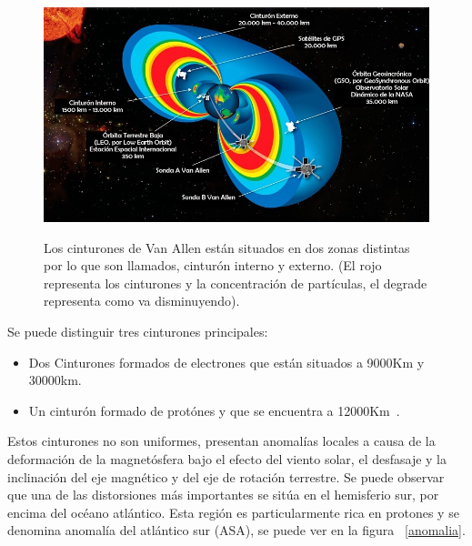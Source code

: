 \documentclass[a4paper,openright,12pt]{report}
\begin{document}
\begin{figure}[H]
	\centering
	\includegraphics[width=1 \textwidth]{img/Cinturones.jpg}
	\caption{Los cinturones de Van Allen están situados en dos zonas distintas por lo que son llamados, cinturón interno y externo. (El rojo representa los cinturones y la concentración de partículas, el degrade representa como va disminuyendo). } \cite{NASA3}
	\label{Cinturones}
\end{figure}

Se puede distinguir tres cinturones principales:
\begin{itemize}
  \item Dos Cinturones formados de electrones que están situados a 9000Km y 30000km.
  \item Un cinturón formado de protónes y que se encuentra a 12000Km~\cite{boudenottenue}.
\end{itemize} 

Estos cinturones no son uniformes, presentan  anomalías locales a causa de la deformación de la magnetósfera bajo el efecto del viento solar, el desfasaje y la inclinación del eje magnético y del eje  de rotación terrestre. Se puede observar que una de las distorsiones más importantes se sitúa en el hemisferio sur, por encima del océano atlántico. Esta región es particularmente rica en protones y se denomina  anomalía del atlántico sur (ASA), se puede ver en la figura ~\ref{anomalia}.
%
%
%
%
\end{document}
